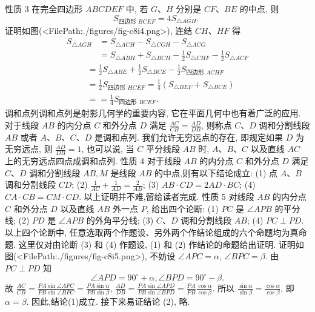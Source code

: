 性质 3 在完全四边形 $A B C D E F$ 中, 若 $G 、 H$ 分别是 $C F 、 B E$ 的中点, 则
$$
S_{\text {四边形 } B C E F}=4 S_{\triangle A G H} \text {. }
$$
证明如图(<FilePath:./figures/fig-c8i4.png>), 连结 $C H 、 H F$ 得
$$
\begin{aligned}
S_{\triangle A G H} & =S_{\triangle A C H}-S_{\triangle C G H}-S_{\triangle A C G} \\
& =S_{\triangle A B H}+S_{\triangle B C H}-\frac{1}{2} S_{\triangle C H F}-\frac{1}{2} S_{\triangle A C F}
\end{aligned}
$$
$$
\begin{aligned}
& =\frac{1}{2} S_{\triangle A B E}+\frac{1}{2} S_{\triangle B C E}-\frac{1}{2} S_{\text {四边形 } A C H F} \\
& =\frac{1}{2} S_{\text {四边形 } H C E F}=\frac{1}{4}\left(S_{\triangle B E F}+S_{\triangle B C E}\right) \\
& ==\frac{1}{4} S_{\text {四边形 } B C E F} .
\end{aligned}
$$
调和点列调和点列是射影几何学的重要内容, 它在平面几何中也有着广泛的应用.
对于线段 $A B$ 的内分点 $C$ 和外分点 $D$ 满足 $\frac{A C}{C B}=\frac{A D}{D B}$, 则称点 $C 、 D$ 调和分割线段 $A B$ 或者 $A 、 B 、 C 、 D$ 是调和点列.
我们允许无穷远点的存在, 即规定如果 $D$ 为无穷远点, 则 $\frac{A D}{D B}=1$, 也可以说, 当 $C$ 平分线段 $A B$ 时, $A 、 B 、 C$ 以及直线 $A C$ 上的无穷远点四点成调和点列.
性质 4 对于线段 $A B$ 的内分点 $C$ 和外分点 $D$ 满足 $C 、 D$ 调和分割线段 $A B, M$ 是线段 $A B$ 的中点,则有以下结论成立:
(1) 点 $A 、 B$ 调和分割线段 $C D$;
(2) $\frac{1}{A C}+\frac{1}{A D}=\frac{2}{A B}$;
(3) $A B \cdot C D=2 A D \cdot B C$;
(4) $C A \cdot C B=C M \cdot C D$.
以上证明并不难,留给读者完成.
性质 5 对线段 $A B$ 的内分点 $C$ 和外分点 $D$ 以及直线 $A B$ 外一点 $P$, 给出四个论断:
(1) $P C$ 是 $\angle A P B$ 的平分线;
(2) $P D$ 是 $\angle A P B$ 的外角平分线;
(3) $C 、 D$ 调和分割线段 $A B$;
(4) $P C \perp P D$.
以上四个论断中, 任意选取两个作题设、另外两个作结论组成的六个命题均为真命题.
这里仅对由论断 (3) 和 (4) 作题设, (1) 和 (2) 作结论的命题给出证明.
证明如图(<FilePath:./figures/fig-c8i5.png>), 不妨设 $\angle A P C=\alpha$, $\angle B P C=\beta$.
由 $P C \perp P D$ 知
$$
\angle A P D=90^{\circ}+\alpha, \angle B P D=90^{\circ}-\beta .
$$
故 $\frac{A C}{C B}=\frac{P A \sin \angle A P C}{P B \sin \angle B P C}=\frac{P A \sin \alpha}{P B \sin \beta}$,
$\frac{A D}{D B}=\frac{P A \sin \angle A P D}{P B \sin \angle B P D}=\frac{P A}{P B} \frac{\cos \alpha}{\cos \beta}$.
所以 $\frac{\sin \alpha}{\sin \beta}=\frac{\cos \alpha}{\cos \beta}$, 即 $\alpha=\beta$.
因此,结论(1)成立.
接下来易证结论 (2), 略.



